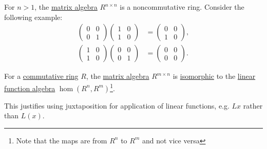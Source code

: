 \begin{example}\label{ex:matrix_multiplication_is_noncommutative}
  For \( n > 1 \), the \hyperref[thm:matrix_algebra]{matrix algebra} \( R^{n \times n} \) is a noncommutative ring. Consider the following example:
  \begin{align*}
    \begin{pmatrix}
      0 & 0 \\
      0 & 1
    \end{pmatrix}
    \begin{pmatrix}
      1 & 0 \\
      1 & 0
    \end{pmatrix}
    &=
    \begin{pmatrix}
      0 & 0 \\
      1 & 0
    \end{pmatrix},
    \\
    \begin{pmatrix}
      1 & 0 \\
      1 & 0
    \end{pmatrix}
    \begin{pmatrix}
      0 & 0 \\
      0 & 1
    \end{pmatrix}
    &=
    \begin{pmatrix}
      0 & 0 \\
      0 & 0
    \end{pmatrix}.
  \end{align*}
\end{example}

\begin{proposition}\label{thm:finite_dimensional_operators_are_isomorphic_to_matrices}
  For a \hyperref[def:ring/commutative]{commutative ring} \( R \), the \hyperref[def:matrix_algebra]{matrix algebra} \( R^{m \times n} \) is \hyperref[def:algebra_over_semiring/homomorphism]{isomorphic} to the \hyperref[thm:functions_over_algebra]{linear function algebra} \( \hom(R^n, R^m) \)\footnote{Note that the maps are from \( R^n \) to \( R^m \) and not vice versa}.

  This justifies using juxtaposition for application of linear functions, e.g. \( Lx \) rather than \( L(x) \).
\end{proposition}

